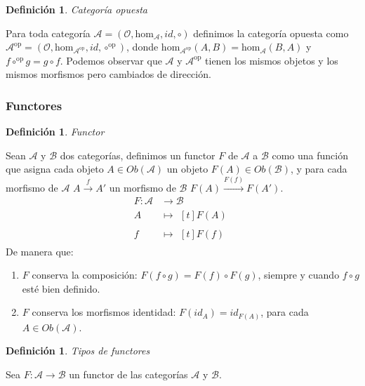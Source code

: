 \documentclass[11pt,a4paper,openright,oneside]{article}
\numberwithin{equation}{section}
\newtheorem{defi}[teo]{Definici\'on}
\theoremstyle{definition}
\begin{document}
\begin{defi}
    Categor\'ia opuesta
\end{defi}
Para toda categor\'ia $\mathcal{A} = (\mathcal{O}, \text{hom}_{\mathcal{A}}, \mathit{id}, \circ)$ definimos la categor\'ia opuesta como $\mathcal{A}^{\text{op}} = (\mathcal{O}, \text{hom}_{\mathcal{A}^{\text{op}}}, \mathit{id}, \circ^{\text{op}})$,
donde $\text{hom}_{\mathcal{A}^{\text{op}}}(A,B) = \text{hom}_{\mathcal{A}}(B,A)$ y $f\circ^{\text{op}}g = g\circ f$. Podemos observar que $\mathcal{A}$ y $\mathcal{A}^{\text{op}}$ tienen los mismos objetos y los mismos morfismos pero cambiados de direcci\'on.


\subsubsection{Functores}
\begin{defi}
    Functor
\end{defi}
Sean $\mathcal{A}$ y $\mathcal{B}$ dos categor\'ias, definimos un functor $F$ de $\mathcal{A}$ a $\mathcal{B}$ como una funci\'on que asigna cada objeto $A \in\mathit{Ob}(\mathcal{A})$ un objeto $F(A) \in\mathit{Ob}(\mathcal{B})$,
y para cada morfismo de $\mathcal{A}$ $A \overset{f}{\longrightarrow} A'$ un morfismo de $\mathcal{B}$ $F(A) \overset{F(f)}{\longrightarrow} F(A')$.
\begin{align*}
    F: \mathcal{A} & \longrightarrow \mathcal{B} \\
    A              & \longmapsto\!
    \begin{aligned}[t]
        F(A)
    \end{aligned}                    \\
    f              & \longmapsto\!
    \begin{aligned}[t]
        F(f)
    \end{aligned}
\end{align*}
De manera que:
\begin{enumerate}[(1)]
    \item $F$ conserva la composici\'on: $F(f\circ g) = F(f)\circ F(g)$, siempre y cuando $f\circ g$ est\'e bien definido.
    \item $F$ conserva los morfismos identidad: $F(\mathit{id}_A)=\mathit{id}_{F(A)}$, para cada $A \in\mathit{Ob}(\mathcal{A})$.
\end{enumerate}
\begin{defi}
    Tipos de functores
\end{defi}
Sea $F: \mathcal{A}\longrightarrow\mathcal{B}$ un functor de las categor\'ias $\mathcal{A}$ y $\mathcal{B}$.
\end{document}
